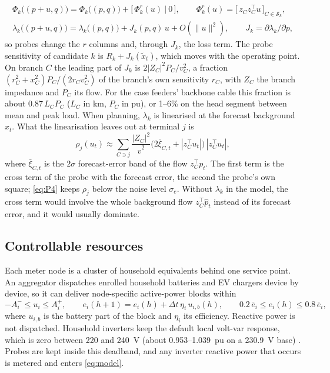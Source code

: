 \documentclass[journal,onecolumn,11pt]{IEEEtran}
\newcommand{\tp}{^{\top}}
\begin{document}
\begin{equation}\label{eq:probecols}
\begin{gathered}
\Phi_k\big((p+u,q)\big)=\Phi_k\big((p,q)\big)+\big[\,\Phi^r_k(u)\ \big|\ 0\,\big],\qquad
\Phi^r_k(u)=\big[\,z_{C}z_{C}\tp u\,\big]_{C\in\mathcal S_k},\\
\lambda_k\big((p+u,q)\big)=\lambda_k\big((p,q)\big)+J_k(p,q)\,u+O(\|u\|^2),\qquad J_k=\partial\lambda_k/\partial p,
\end{gathered}
\end{equation}
so probes change the $r$ columns and, through $J_k$, the loss term. The probe sensitivity of candidate $k$ is $R_k+J_k(\tilde x_t)$, which moves with the operating point. On branch $C$ the leading part of $J_k$ is $2|Z_C|^2P_C/v_C^2$, a fraction $(r_C^2+x_C^2)P_C/(2r_Cv_C^2)$ of the branch's own sensitivity $r_C$, with $Z_C$ the branch impedance and $P_C$ its flow. For the case feeders' backbone cable this fraction is about $0.87\,L_CP_C$ ($L_C$ in km, $P_C$ in pu), or 1--6\% on the head segment between mean and peak load. When planning, $\lambda_k$ is linearised at the forecast background $\hat x_t$. What the linearisation leaves out at terminal $j$ is
\begin{equation}\label{eq:rho}
\rho_j(u_t)\approx\sum_{C\ni j}\frac{|Z_C|^2}{\hat v^2}\big(2\bar\xi_{C,t}+|z_C\tp u_t|\big)\,|z_C\tp u_t|,
\end{equation}
where $\bar\xi_{C,t}$ is the $2\sigma$ forecast-error band of the flow $z_C\tp p_t$. The first term is the cross term of the probe with the forecast error, the second the probe's own square; \eqref{eq:P4} keeps $\rho_j$ below the noise level $\sigma_e$. Without $\lambda_k$ in the model, the cross term would involve the whole background flow $z_C\tp\hat p_t$ instead of its forecast error, and it would usually dominate.

\subsection{Controllable resources}
Each meter node is a cluster of household equivalents behind one service point. An aggregator dispatches enrolled household batteries and EV chargers device by device, so it can deliver node-specific active-power blocks within
\begin{equation}\label{eq:env}
-A_i^{-}\le u_i\le A_i^{+},\qquad
e_i(h+1)=e_i(h)+\Delta t\,\eta_i\,u_{i,b}(h),\qquad 0.2\,\bar e_i\le e_i(h)\le 0.8\,\bar e_i,
\end{equation}
where $u_{i,b}$ is the battery part of the block and $\eta_i$ its efficiency. Reactive power is not dispatched. Household inverters keep the default local volt-var response, which is zero between 220 and 240~V (about 0.953--1.039~pu on a 230.9~V base) \cite{asnzs4777}. Probes are kept inside this deadband, and any inverter reactive power that occurs is metered and enters \eqref{eq:model}.
\end{document}

